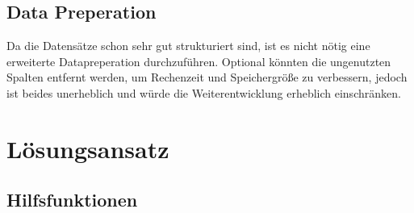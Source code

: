 \documentclass{article}
\begin{document}
\subsection{Data Preperation}
Da die Datensätze schon sehr gut strukturiert sind, ist es nicht nötig eine erweiterte Datapreperation durchzuführen.
Optional könnten die ungenutzten Spalten entfernt werden, um Rechenzeit und Speichergröße zu verbessern, jedoch ist beides unerheblich und würde die Weiterentwicklung erheblich einschränken.

\section{Lösungsansatz}
\subsection{Hilfsfunktionen}
\end{document}
